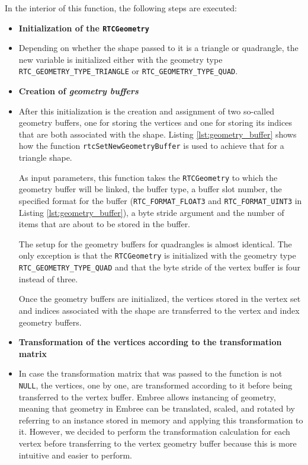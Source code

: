 In the interior of this function, the following steps are executed:

\begin{itemize}
	\setlength\itemsep{0.05em}
	
	\item \textbf{Initialization of the \texttt{RTCGeometry}}
	\item[] Depending on whether the shape passed to it is a triangle or quadrangle, the new  variable is initialized either with the geometry type \texttt{RTC\_GEOMETRY\_TYPE\_TRIANGLE} or \texttt{RTC\_GEOMETRY\_TYPE\_QUAD}.
	\\
	
	\item \textbf{Creation of \emph{geometry buffers}}
	\item[] After this initialization is the creation and assignment of two so-called geometry buffers, one for storing the vertices and one for storing its indices that are both associated with the shape. Listing \ref{lst:geometry_buffer} shows how the function \texttt{rtcSetNewGeometryBuffer} is used to achieve that for a triangle shape.
	
	As input parameters, this function takes the \texttt{RTCGeometry} to which the geometry buffer will be linked, the buffer type, a buffer slot number, the specified format for the buffer (\texttt{RTC\_FORMAT\_FLOAT3} and \texttt{RTC\_FORMAT\_UINT3} in Listing \ref{lst:geometry_buffer}), a byte stride argument and the number of items that are about to be stored in the buffer. 
	
	The setup for the geometry buffers for quadrangles is almost identical. The only exception is that the \texttt{RTCGeometry} is initialized with the geometry type \texttt{RTC\_GEOMETRY\_TYPE\_QUAD} and that the byte stride of the vertex buffer is four instead of three.
	
	Once the geometry buffers are initialized, the vertices stored in the vertex set and indices associated with the shape are transferred to the vertex and index geometry buffers.
	\\
	
	\item \textbf{Transformation of the vertices according to the transformation matrix}
	\item[] In case the transformation matrix that was passed to the function is not \texttt{NULL}, the vertices, one by one, are transformed according to it before being transferred to the vertex buffer. Embree allows instancing of geometry, meaning that geometry in Embree can be translated, scaled, and rotated by referring to an instance stored in memory and applying this transformation to it. However, we decided to perform the transformation calculation for each vertex before transferring to the vertex geometry buffer because this is more intuitive and easier to perform.
	
\end{itemize}

